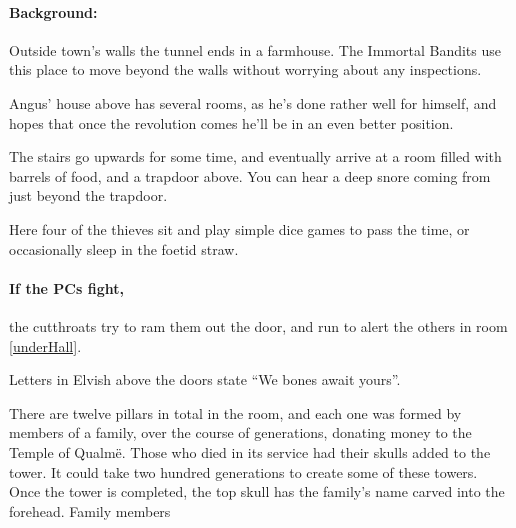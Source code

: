 \begin{multicols}{2}
\label{farmExit}

\paragraph{Background:}
Outside \gls{town}'s walls the tunnel ends in a farmhouse.
The Immortal Bandits use this place to move beyond the walls without worrying about any inspections.

Angus' house above has several rooms, as he's done rather well for himself, and hopes that once the revolution comes he'll be in an even better position.

\begin{boxtext}

  The stairs go upwards for some time, and eventually arrive at a room filled with barrels of food, and a trapdoor above.
  You can hear a deep snore coming from just beyond the trapdoor.

\end{boxtext}


\label{underGuard}

Here four of the thieves sit and play simple dice games to pass the time, or occasionally sleep in the foetid straw.

\paragraph{If the PCs fight,}
the cutthroats try to ram them out the door, and run to alert the others in room \ref{underHall}.



\begin{boxtext}
  Letters in Elvish above the doors state ``We bones await yours''.
\end{boxtext}

There are twelve pillars in total in the room, and each one was formed by members of a family, over the course of generations, donating money to the Temple of Qualm\"{e}.  Those who died in its service had their skulls added to the tower.  It could take two hundred generations to create some of these towers.  Once the tower is completed, the top skull has the family's name carved into the forehead.  Family members

\begin{boxtext}


\end{boxtext}
\end{multicols}
